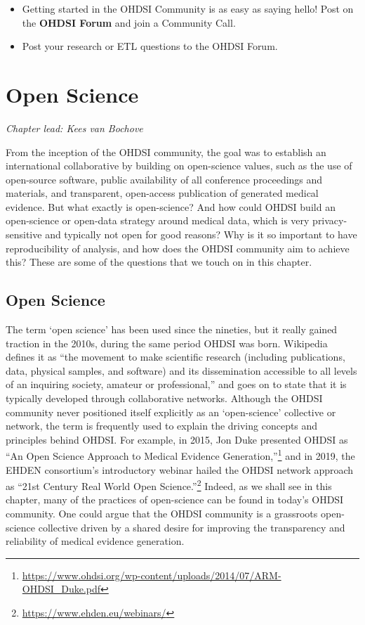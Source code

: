 \documentclass[11pt]{book}
\providecommand{\tightlist}{%
  \setlength{\itemsep}{0pt}\setlength{\parskip}{0pt}}
\let\rmarkdownfootnote\footnote%
\def\footnote{\protect\rmarkdownfootnote}
\theoremstyle{definition}
\theoremstyle{definition}
\theoremstyle{definition}
\theoremstyle{remark}
\let\BeginKnitrBlock\begin \let\EndKnitrBlock\end
\begin{document}
\BeginKnitrBlock{rmdsummary}
\begin{itemize}
\tightlist
\item
  Getting started in the OHDSI Community is as easy as saying hello!
  Post on the \textbf{OHDSI Forum} and join a Community Call.
\item
  Post your research or ETL questions to the OHDSI Forum.
\end{itemize}
\EndKnitrBlock{rmdsummary}

\chapter{Open Science}\label{OpenScience}


\emph{Chapter lead: Kees van Bochove}

From the inception of the OHDSI community, the goal was to establish an
international collaborative by building on open-science values, such as
the use of open-source software, public availability of all conference
proceedings and materials, and transparent, open-access publication of
generated medical evidence. But what exactly is open-science? And how
could OHDSI build an open-science or open-data strategy around medical
data, which is very privacy-sensitive and typically not open for good
reasons? Why is it so important to have reproducibility of analysis, and
how does the OHDSI community aim to achieve this? These are some of the
questions that we touch on in this chapter.

\section{Open Science}\label{open-science}

The term `open science' has been used since the nineties, but it really
gained traction in the 2010s, during the same period OHDSI was born.
Wikipedia \citep{wiki:Open_science} defines it as ``the movement to make
scientific research (including publications, data, physical samples, and
software) and its dissemination accessible to all levels of an inquiring
society, amateur or professional,'' and goes on to state that it is
typically developed through collaborative networks. Although the OHDSI
community never positioned itself explicitly as an `open-science'
collective or network, the term is frequently used to explain the
driving concepts and principles behind OHDSI. For example, in 2015, Jon
Duke presented OHDSI as ``An Open Science Approach to Medical Evidence
Generation,''\footnote{\url{https://www.ohdsi.org/wp-content/uploads/2014/07/ARM-OHDSI_Duke.pdf}}
and in 2019, the EHDEN consortium's introductory webinar hailed the
OHDSI network approach as ``21st Century Real World Open
Science.''\footnote{\url{https://www.ehden.eu/webinars/}} Indeed, as we
shall see in this chapter, many of the practices of open-science can be
found in today's OHDSI community. One could argue that the OHDSI
community is a grassroots open-science collective driven by a shared
desire for improving the transparency and reliability of medical
evidence generation.
\end{document}
